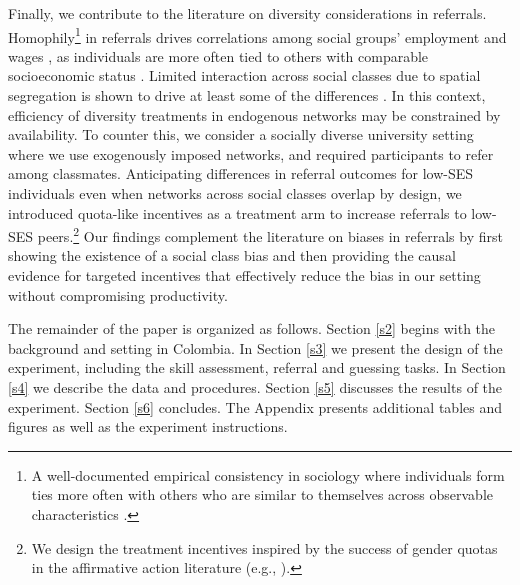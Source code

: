 \documentclass[11pt,a4paper,oneside]{article}
\begin{document}
Finally, we contribute to the literature on diversity considerations in referrals. Homophily\footnote{A well-documented empirical consistency in sociology where individuals form ties more often with others who are similar to themselves across observable characteristics \citep{mcpherson2001birds,mcpherson2006social}.} in referrals drives correlations among social groups' employment and wages \citep{calvo2004effects,calvo2007networks}, as individuals are more often tied to others with comparable socioeconomic status \citep{chetty2022social_a}. Limited interaction across social classes due to spatial segregation is shown to drive at least some of the differences \citep{chetty2022social_b}. In this context, efficiency of diversity treatments in endogenous networks may be constrained by availability. To counter this, we consider a socially diverse university setting where we use exogenously imposed networks, and required participants to refer among classmates. Anticipating differences in referral outcomes for low-SES individuals even when networks across social classes overlap by design, we introduced quota-like incentives as a treatment arm to increase referrals to low-SES peers.\footnote{We design the treatment incentives inspired by the success of gender quotas in the affirmative action literature (e.g., \citet{bertrand2019breaking, balafoutas2012affirmative, niederle2013costly}).} Our findings complement the literature on biases in referrals \citep{hederos2024gender,beugnot2020gender} by first showing the existence of a social class bias and then providing the causal evidence for targeted incentives that effectively reduce the bias in our setting without compromising productivity.

The remainder of the paper is organized as follows. Section \ref{s2} begins with the background and setting in Colombia. In Section \ref{s3} we present the design of the experiment, including the skill assessment, referral and guessing tasks. In Section \ref{s4} we describe the data and procedures. Section \ref{s5} discusses the results of the experiment. Section \ref{s6} concludes. The Appendix presents additional tables and figures as well as the experiment instructions.
\end{document}
